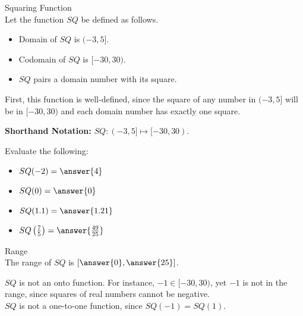 \documentclass{ximera}
\begin{document}
\begin{example} Squaring Function \\

Let the function $SQ$ be defined as follows.


\begin{itemize}
\item Domain of $SQ$ is $(-3, 5]$.
\item Codomain of $SQ$ is $[-30, 30)$.
\item $SQ$ pairs a domain number with its square.
\end{itemize}


First, this function is well-defined, since the square of any number in $(-3, 5]$ will be in $[-30, 30)$ and each domain number has exactly one square.


\textbf{Shorthand Notation: } $SQ: (-3, 5] \mapsto [-30, 30)$.

\begin{question}
Evaluate the following:

\begin{itemize}
	\item $SQ(-2) = \answer{4}$
	\item $SQ(0) = \answer{0}$
	\item $SQ(1.1) = \answer{1.21}$
	\item $SQ\left(\frac{7}{5}\right) = \answer{\frac{49}{25}}$
\end{itemize}

\end{question}




\begin{question} Range \\

The range of $SQ$ is $\left[ \answer{0}, \answer{25} \right]$.

\end{question}

$SQ$ is not an onto function.  For instance, $-1 \in [-30,30)$, yet $-1$ is not in the range, since squares of real numbers cannot be negative. \\


$SQ$ is not a one-to-one function, since $SQ(-1)=SQ(1)$.
\end{example}
\end{document}
